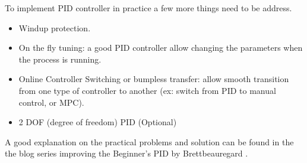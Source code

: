 To implement PID controller in practice a few more things need to be address.

\begin{itemize}
    \item Windup protection.
    \item On the fly tuning: a good PID controller allow changing the parameters when the process is running.
    \item Online Controller Switching or bumpless transfer:  allow smooth transition from one type of controller to another (ex: switch from PID to manual control, or MPC).
    \item 2 DOF (degree of freedom) PID (Optional) 
\end{itemize}

A good explanation on the practical problems and solution can be found in the the blog series improving the Beginner’s PID by Brettbeauregard \cite{Improving_PID}.


\newpage
